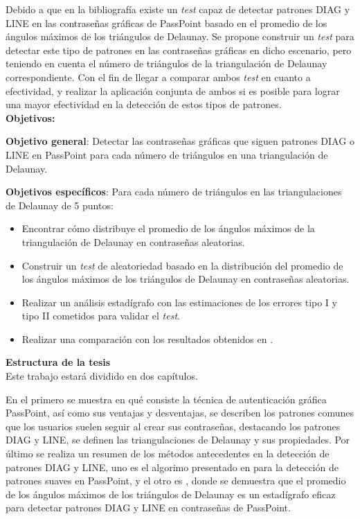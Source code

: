 \documentclass[12pt]{report}
\begin{document}
	\normalsize{
		Debido a que en la bibliografía existe un \textit{test} capaz de detectar patrones DIAG y LINE en las contraseñas gráficas de PassPoint basado en el promedio de los ángulos máximos de los triángulos de Delaunay. Se propone construir un \textit{test} para detectar este tipo de patrones en las contraseñas gráficas en dicho escenario, pero teniendo en cuenta el número de triángulos de la triangulación de Delaunay correspondiente. Con el fin de llegar a comparar ambos \textit{test} en cuanto a efectividad, y realizar la aplicación conjunta de ambos si es posible para lograr una mayor efectividad en la detección de estos tipos de patrones.
		}\\

	\large{\textbf{Objetivos:}}
	
	\normalsize{\textbf{Objetivo general}}: Detectar las contraseñas gráficas que siguen patrones DIAG o LINE en PassPoint para cada número de triángulos en una triangulación de Delaunay.
	
	\normalsize{\textbf{Objetivos específicos}}:
	Para cada número de triángulos  en las triangulaciones de Delaunay de 5 puntos:
	
	\begin{itemize}
		\item Encontrar cómo distribuye el promedio de los ángulos máximos de la triangulación de Delaunay en contraseñas aleatorias.
		\item Construir un \textit{test} de aleatoriedad basado en la distribución del promedio de los ángulos máximos de los triángulos de Delaunay en contraseñas aleatorias.
		
		\item Realizar un análisis estadígrafo con las estimaciones de los errores tipo I y tipo II cometidos para validar el \textit{test}.
		
		\item Realizar una comparación con los resultados obtenidos en \cite{13}.
		
	\end{itemize}
	
	
	{\large{\textbf{Estructura de la tesis}}}\\
	
	Este trabajo estará dividido en dos capítulos.
	
	En el primero se muestra en qué consiste la técnica de autenticación gráfica PassPoint, así como sus ventajas y desventajas, se describen los patrones comunes que los usuarios suelen seguir al crear sus contraseñas, destacando los patrones DIAG y LINE, se definen las triangulaciones de Delaunay y sus propiedades. Por último se realiza un resumen  de los métodos antecedentes en la detección de patrones DIAG y LINE, uno es el algorimo presentado en \cite{3} para la detección de patrones suaves en PassPoint, y el otro es \cite{13}, donde se demuestra que el promedio de los ángulos máximos de los  triángulos de Delaunay es un estadígrafo eficaz para detectar patrones DIAG y LINE en contraseñas de PassPoint.
	
\end{document}
